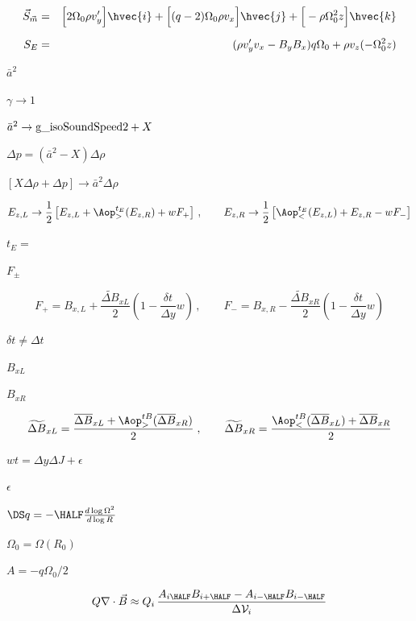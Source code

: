 \documentclass{article}
\begin{document}
\begin{eqnarray*}     \vec{S}_{\vec{m}} &=&
           \Big[ 2\Omega_0\rho v'_y\Big]\hvec{i}
         + \Big[(q-2)\Omega_0\rho v_x\Big]\hvec{j}
         + \Big[-\rho\Omega_0^2z\Big]\hvec{k} \\ \noalign{\medskip}
       S_E &=& (\rho v'_yv_x - B_yB_x)q\Omega_0 + \rho v_z(-\Omega_0^2 z)
\end{eqnarray*}
\pagebreak

$ \bar{a}^2 $
\pagebreak

$ \gamma \to 1$
\pagebreak

$\bar{a}^2 \to {\rm g\_isoSoundSpeed2} + X$
\pagebreak

$ \Delta p = (\bar{a}^2 - X)\Delta\rho$
\pagebreak

$ [X\Delta\rho + \Delta p] \to \bar{a}^2\Delta\rho $
\pagebreak

\[   E_{z,L} \to \frac{1}{2}\left[E_{z,L} + \Aop^{t_E}_{>}(E_{z,R})
         + wF_{+}\right]
 \,,\qquad
   E_{z,R} \to \frac{1}{2}\left[\Aop^{t_E}_<(E_{z,L}) + E_{z,R}
         - wF_-\right]
\]
\pagebreak

$t_E =$
\pagebreak

$F_{\pm}$
\pagebreak

\[   F_{+} = B_{x,L} + \frac{\widetilde{\Delta B}_{xL}}{2}
           \left(1 - \frac{\delta t}{\Delta y}w\right)
 \,,\qquad
   F_{-} = B_{x,R} - \frac{\widetilde{\Delta B}_{xR}}{2}
           \left(1 - \frac{\delta t}{\Delta y}w\right)
\]
\pagebreak

$ \delta t\ne \Delta t$
\pagebreak

$B_{xL}$
\pagebreak

$B_{xR}$
\pagebreak

\[  \widetilde{\Delta B}_{xL} = 
  \frac{                \overline{\Delta B}_{xL} 
          + \Aop^{tB}_{>}(\overline{\Delta B}_{xR})}{2}
   \;,\qquad
  \widetilde{\Delta B}_{xR} = 
  \frac{ \Aop^{tB}_{<}(\overline{\Delta B}_{xL}) 
                     + \overline{\Delta B}_{xR}}{2}         
\]
\pagebreak

$ wt = 
 \Delta y\Delta J + \epsilon $
\pagebreak

$ \epsilon $
\pagebreak

$\DS q = -\HALF\frac{d\log
            \Omega^2}{d\log R} $
\pagebreak

$ \Omega_0 = 
                \Omega(R_0)$
\pagebreak

$ A = -q\Omega_0/2 $
\pagebreak

\[  Q\nabla\cdot\vec{B} \approx Q_i\, 
  \frac{A_{i\HALF}B_{i+\HALF} - A_{i-\HALF}B_{i-\HALF}}{\Delta{\cal V}_i}
\]
\pagebreak
\end{document}
